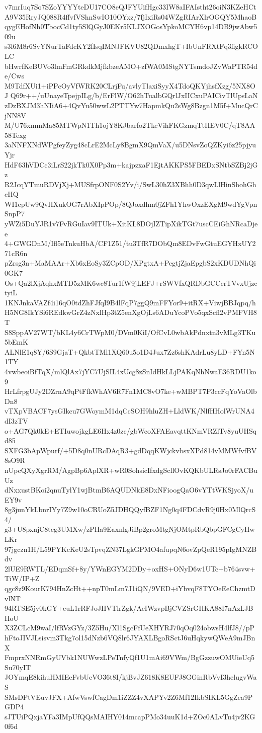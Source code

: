 v7mrIuq7So7SZoYYYYteDU17CO8eQJFYUifHgc33IW8aIFAIstht26oiN3KZeHCt
A9V35RryJQ088R4ffvfVShnSwIO10OYxz/7fjIxiRs04WZgRIArXlrOGQY5MhaoB
qygEHofNh0TbocCd1ty5SlQGyJ0EKr5KLJXOGosYpkoMCYH6vp14DB9jwAbw509u
s3l6M8r6SvYNurTaFdcKY2fIsqIMNJFKVU82QDmxhgT+IbUnFRXtFq3figkRCOLC
bHwrfKeBUVo3lmFmGRkdkMjfkbzeAMO+zfWA0MStgNYTsmdoJZvWaPTR54de/Cws
M9TdfXUi1+iPPcOyVfWRK20CLrjFu/avlyTlaxiSyyX4TdoQKYjhsfXzg/5NX8OJ
Q69r++/uUnayeTpejpILg/b/ErFlW/O62hTualbGQrlJxIICxuPAICivTlUpsLaN
zDzBXJM3hNIiA6+4QvYu50wwL2PTTYw7HapmkQu2sWg8Bzgn1M5f+MucQrCjNN8V
M/U76xmmMa85MTWpN1Th1ojY8KJbarfo2TkcVihFKGzmqTtHEV0C/qT8AA58Texg
3aNNFXNdWPgfeyZyg48cLrE2McLy8BgmX9QmVaX/u5DNsvZoQZKyi6z25pjyuYjr
HdF63hVDCc3iLrS22jkTk0X0Pp3m+kajpzxaF1EjtAKKPS5FBEDxSNtbSZBj2jGz
R2JcqYTmuRDVjXj+MUSfrpONF0S2Yv/i/SwL30hZ3XBhh0D3qwLlHinShohGhcHQ
WI1epUw9QvHXukOG7rAbXIpPOp/8QJoxdhm0jZFh1YhwOxzEXgM9wdYgVpnSnpP7
yWZi5DuYJR1v7FvRGuIav9ITUk+XitKL8DOjIZTipXikTGt7uscCEiGhNRcaDjee
4+GWGDnM/Ifl5eTnkuHbA/CF1Z51/tu3TfR7DObQm8EDvFwGtuEGYHxUY271cR6n
pZrsg3n+MaMAAr+Xb6xEoSy3ZCpOD/XPgtxA+PegtjZjaEpgbS2xKDUDNhQi0GK7
Os+Qa2lXjAqhxMTD5zMK6wc8Tur1fW9jLEFJ+rSWVfxQRDbGCCcrTVvxUjzetyiL
1KNJnkaVAZf4i16qO0tdZhFJfqI9B4lFqP7ggQ9mFFYor9+itRX+ViwjBBJqpq/h
H5NG8IkYSi6REdkwGrZ4zNxlHp3tZ5enXgOjLs6ADuYcoPVo5qxScfl2vPMFVH8T
S8SppAV27WT/bKL4y6CrTWpM0/DVm0KiI/OfCvL0wbAkPdnxtn3vMLg3TKu5bEmK
ALNlE1q8Y/6S9GjaT+QkbtTMl1XQ60u5o1D4Jux7Zz6shKAdrLu8yLD+FYn5N1TY
4vwbeoiBfTqX/mlQlAx7jYC7UjSIL4xUcg8zSnIdHkLLjPAKqNhNwaE36RDU1ko9
HrLfrpgUJy2DZrnA9qPtFfkWhAV6R7Fn1MC8vO7ke+wMBPT7P3ccFqYoVaOlbDn8
vTXpVBACF7ysGIkcu7GWoymM1dqCcSOH9hluZH+LldWK/NlfHHolWrUNA4dI3zTV
o+AG7Qk0kE+ETIuwojkgLE6Hx4z0zc/gbWcoXFAEavqttKNmVRZlTv8yuUHSqd85
SXFG3bApWpurf/+5D8q0nURcDAqR3+gdDqqKWjckvbsxXPd814vMMWfvfBV8sO9R
nUpcQXyXgrRM/AgpBp6AplXR+wR0SohsicIfxdgScllOvKQKbULRsJo0rFACBuUz
dNxxustBKoi2qnuTylY1wjBtmB6AQUDNkE8DxNFioogQaO6vYTtWKSjyoX/uEY9v
8g3junYkLbnrIYy7Z9w10oCRUoZ5JDHQQyfBZF1Ng0q4FDCdvR9j0Hx0MlQrcS4/
g3+U8pxnjC8tcg3UMXw/zPHa9EaxnlgJiBp2groMtgNjOMtpRbQbpGFCgCyHwLKr
97jgczn1H/L59PYKcKeU2sTpvqZN37LgkGPMO4afupqN6ovZpQeR195pIgMNZBdv
2lUE9RWTL/EDqmSf+8y/YWnEGYM2DDy+oxHS+ONyD6w1UTc+b764svw+TiW/IP+Z
qgc8z9KourK794HnZcHt++npT0mLm7J1iQN/9VED+iYbvqF8TYOeEeChzmtDvlNT
94RTSE5jv0kGY+euL1rRFJoJHVTlrZgk/AeIWzvpBjCVZSrGHKA88I7nAzLJBHoU
X3ZCLcM9waI/lfRVzGYz/3Z5Hu/Xl1SgcFfUeXHYRJ70qOq024obwsH4lfJ8//pP
hFtoJIVJLsisvm3Tkg7ol15dNzb6VQ8lr6JYAXLBgoRSctJ6uHqkywQWeA9mJBnX
FmprxNNRmGyUVbk1NUWwzLPeTnfyQf1U1mAi69VWm/BgGzzuwOMUieUq5Su70yIT
JOYmqE8kihuHMIEeFvbUcVO36t8I/kjBvJZ618K8EUFJ8GGinRbVvI3helugvWaS
SMsDPtVEuvJFX+AfwVswfCagDm1iZZZ4vXAPYv2Z6Mf12IkbSIKL5GgZca9PGDP4
sJTUiPQxjaYFa3IMpUfQQsMAIHY014mcapPMo34uuK1d+ZOc0ALvTu4jv2KG0f6d
